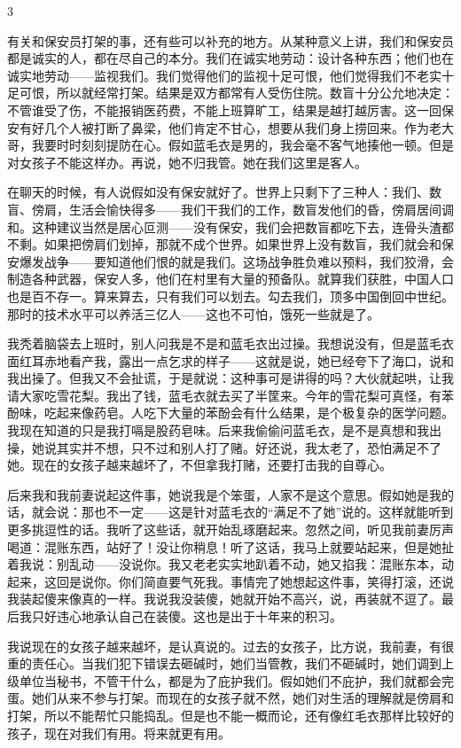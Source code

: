 3 

有关和保安员打架的事，还有些可以补充的地方。从某种意义上讲，我们和保安员都是诚实的人，都在尽自己的本分。我们在诚实地劳动：设计各种东西；他们也在诚实地劳动——监视我们。我们觉得他们的监视十足可恨，他们觉得我们不老实十足可恨，所以就经常打架。结果是双方都常有人受伤住院。数盲十分公允地决定：不管谁受了伤，不能报销医药费，不能上班算旷工，结果是越打越厉害。这一回保安有好几个人被打断了鼻梁，他们肯定不甘心，想要从我们身上捞回来。作为老大哥，我要时时刻刻提防在心。假如蓝毛衣是男的，我会毫不客气地揍他一顿。但是对女孩子不能这样办。再说，她不归我管。她在我们这里是客人。 

在聊天的时候，有人说假如没有保安就好了。世界上只剩下了三种人：我们、数盲、傍肩，生活会愉快得多——我们干我们的工作，数盲发他们的昏，傍肩居间调和。这种建议当然是居心叵测——没有保安，我们会把数盲都吃下去，连骨头渣都不剩。如果把傍肩们划掉，那就不成个世界。如果世界上没有数盲，我们就会和保安爆发战争——要知道他们恨的就是我们。这场战争胜负难以预料，我们狡滑，会制造各种武器，保安人多，他们在村里有大量的预备队。就算我们获胜，中国人口也是百不存一。算来算去，只有我们可以划去。勾去我们，顶多中国倒回中世纪。那时的技术水平可以养活三亿人——这也不可怕，饿死一些就是了。 

我秃着脑袋去上班时，别人问我是不是和蓝毛衣出过操。我想说没有，但是蓝毛衣面红耳赤地看产我，露出一点乞求的样子——这就是说，她已经夸下了海口，说和我出操了。但我又不会扯谎，于是就说：这种事可是讲得的吗？大伙就起哄，让我请大家吃雪花梨。我出了钱，蓝毛衣就去买了半筐来。今年的雪花梨可真怪，有苯酚味，吃起来像药皂。人吃下大量的苯酚会有什么结果，是个极复杂的医学问题。我现在知道的只是我打嗝是股药皂味。后来我偷偷问蓝毛衣，是不是真想和我出操，她说其实并不想，只不过和别人打了赌。好还说，我太老了，恐怕满足不了她。现在的女孩子越来越坏了，不但拿我打赌，还要打击我的自尊心。 

后来我和我前妻说起这件事，她说我是个笨蛋，人家不是这个意思。假如她是我的话，就会说：那也不一定——这是针对蓝毛衣的“满足不了她”说的。这样就能听到更多挑逗性的话。我听了这些话，就开始乱琢磨起来。忽然之间，听见我前妻厉声喝道：混账东西，站好了！没让你稍息！听了这话，我马上就要站起来，但是她扯着我说：别乱动——没说你。我又老老实实地趴着不动，她又掐我：混账东本，动起来，这回是说你。你们简直要气死我。事情完了她想起这件事，笑得打滚，还说我装起傻来像真的一样。我说我没装傻，她就开始不高兴，说，再装就不逗了。最后我只好违心地承认自己在装傻。这也是出于十年来的积习。 

我说现在的女孩子越来越坏，是认真说的。过去的女孩子，比方说，我前妻，有很重的责任心。当我们犯下错误去砸碱时，她们当管教，我们不砸碱时，她们调到上级单位当秘书，不管干什么，都是为了庇护我们。假如她们不庇护，我们就都会完蛋。她们从来不参与打架。而现在的女孩子就不然，她们对生活的理解就是傍肩和打架，所以不能帮忙只能捣乱。但是也不能一概而论，还有像红毛衣那样比较好的孩子，现在对我们有用。将来就更有用。 



